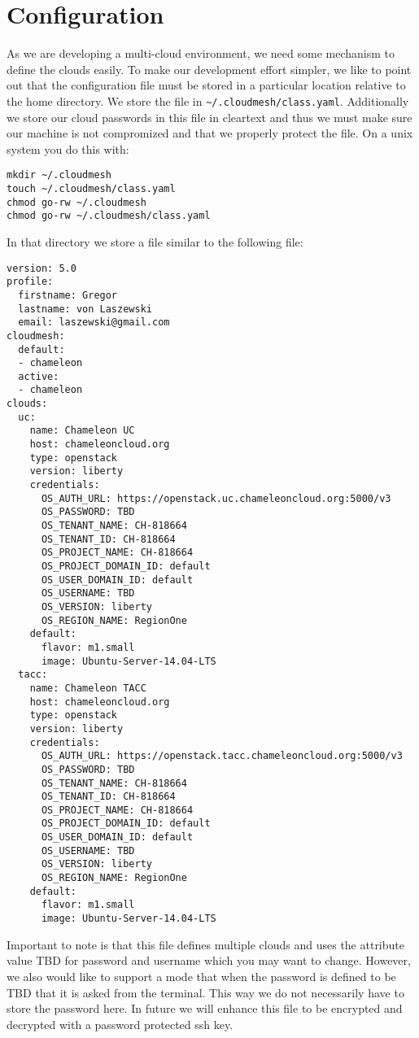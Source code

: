 \section{Configuration}

As we are developing a multi-cloud environment, we need some mechanism
to define the clouds easily. To make our development effort simpler,
we like to point out that the configuration file must be stored in a
particular location relative to the home directory. We store the file
in \verb|~/.cloudmesh/class.yaml|. Additionally we store our cloud
passwords in this file in cleartext and thus we must make sure our
machine is not compromized and that we properly protect the file. On a
unix system you do this with:

\begin{verbatim}
mkdir ~/.cloudmesh
touch ~/.cloudmesh/class.yaml
chmod go-rw ~/.cloudmesh
chmod go-rw ~/.cloudmesh/class.yaml
\end{verbatim}

In that directory we store a file similar to the following file:

\begin{verbatim}
version: 5.0
profile:
  firstname: Gregor
  lastname: von Laszewski
  email: laszewski@gmail.com
cloudmesh:
  default:
  - chameleon 
  active:
  - chameleon
clouds:
  uc:
    name: Chameleon UC
    host: chameleoncloud.org
    type: openstack
    version: liberty
    credentials:
      OS_AUTH_URL: https://openstack.uc.chameleoncloud.org:5000/v3
      OS_PASSWORD: TBD
      OS_TENANT_NAME: CH-818664
      OS_TENANT_ID: CH-818664
      OS_PROJECT_NAME: CH-818664
      OS_PROJECT_DOMAIN_ID: default
      OS_USER_DOMAIN_ID: default
      OS_USERNAME: TBD
      OS_VERSION: liberty
      OS_REGION_NAME: RegionOne
    default:
      flavor: m1.small
      image: Ubuntu-Server-14.04-LTS
  tacc:
    name: Chameleon TACC
    host: chameleoncloud.org
    type: openstack
    version: liberty
    credentials:
      OS_AUTH_URL: https://openstack.tacc.chameleoncloud.org:5000/v3
      OS_PASSWORD: TBD
      OS_TENANT_NAME: CH-818664
      OS_TENANT_ID: CH-818664
      OS_PROJECT_NAME: CH-818664
      OS_PROJECT_DOMAIN_ID: default
      OS_USER_DOMAIN_ID: default
      OS_USERNAME: TBD
      OS_VERSION: liberty
      OS_REGION_NAME: RegionOne
    default:
      flavor: m1.small
      image: Ubuntu-Server-14.04-LTS
\end{verbatim}

Important to note is that this file defines multiple clouds and uses
the attribute value TBD for password and username which you may want
to change. However, we also would like to support a mode that when the
password is defined to be TBD that it is asked from the terminal. This
way we do not necessarily have to store the password here. In future
we will enhance this file to be encrypted and decrypted with a
password protected ssh key.

